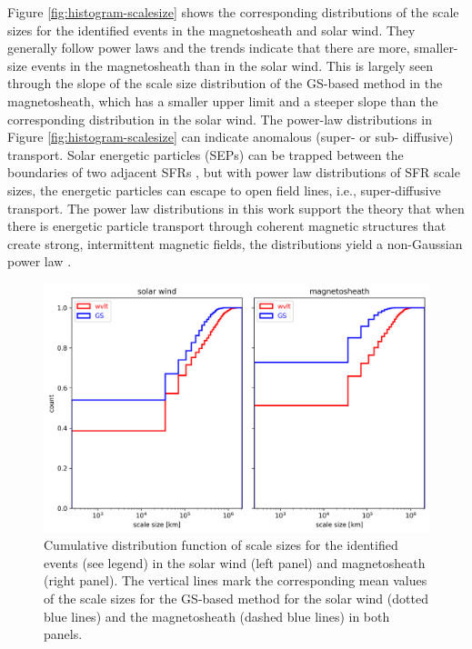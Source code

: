 Figure \ref{fig:histogram-scalesize} shows the corresponding distributions of the scale sizes for the identified events in the magnetosheath and solar wind. They generally follow power laws and the trends indicate that there are more, smaller-size events in the magnetosheath than in the solar wind. This is largely seen through the slope of the scale size distribution of the GS-based method in the magnetosheath, which has a smaller upper limit and a steeper slope than the corresponding distribution in the solar wind. The power-law distributions in Figure \ref{fig:histogram-scalesize} can indicate anomalous (super- or sub- diffusive) transport. Solar energetic particles (SEPs) can be trapped between the boundaries of two adjacent SFRs \citep{leRoux:2023}, but with power law distributions of SFR scale sizes, the energetic particles can escape to open field lines, i.e., super-diffusive transport. The power law distributions in this work support the theory that when there is energetic particle transport through coherent magnetic structures that create strong, intermittent magnetic fields, the distributions yield a non-Gaussian power law \citep{leRoux:2021}.

\begin{figure}
    \centering
    \includegraphics[width=\textwidth]{Figures/Histograms/cdf_scalesize.png}
    \caption[Cumulative distribution function of scale sizes for the identified events]{Cumulative distribution function of scale sizes for the identified events (see legend) in the solar wind (left panel) and magnetosheath (right panel). The vertical lines mark the corresponding mean values of the scale sizes for the GS-based method for the solar wind (dotted blue lines) and the magnetosheath (dashed blue lines) in both panels.}
    \label{fig:cdf-scalesize}
\end{figure}

